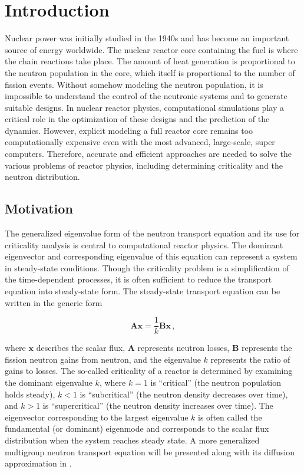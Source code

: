 \cleardoublepage

\chapter{Introduction}
\label{chapter:intro}
Nuclear power was initially studied in the 1940s and has become an important source of energy worldwide.
The nuclear reactor core containing the fuel is where the chain reactions take place.
The amount of heat generation is proportional to the neutron population in the core, which itself is proportional to the number of fission events. 
Without somehow modeling the neutron population, it is impossible to understand the control of the neutronic systems and to generate suitable designs. 
In nuclear reactor physics, computational simulations play a critical role in the optimization of these designs and the prediction of the dynamics.
However, explicit modeling a full reactor core remains too computationally expensive even with the most advanced, large-scale, super computers. 
Therefore, accurate and efficient approaches are needed to solve the various problems of reactor physics, including determining criticality and the neutron distribution.

\section{Motivation}

The generalized eigenvalue form of the neutron transport equation and its use for criticality analysis is central to computational reactor physics.
The dominant eigenvector and corresponding eigenvalue of this equation can represent a system in steady-state conditions.
Though the criticality problem is a simplification of the time-dependent processes, it is often sufficient to reduce the transport equation into steady-state form. 
The steady-state transport equation can be written in the generic form

\begin{equation}
 \mathbf{Ax} = \frac{1}{k} \mathbf{Bx}  \, ,
 \label{eq:Axb}
\end{equation}

where $\mathbf{x}$ describes the scalar flux, $\mathbf{A}$ represents neutron losses,  $\mathbf{B}$ represents the fission neutron gains from neutron, and the eigenvalue $k$ represents the ratio of gains to losses.
The so-called criticality of a reactor is determined by examining the dominant eigenvalue $k$, where $k=1$ is ``critical'' (the neutron population holds steady), $k<1$ is ``subcritical'' (the neutron density decreases over time), and $k > 1$ is ``supercritical'' (the neutron density increases over time).
The eigenvector corresponding to the largest eigenvalue $k$ is often called the fundamental (or dominant) eigenmode and corresponds to the scalar flux distribution when the system reaches steady state.
A more generalized multigroup neutron transport equation will be presented along with its diffusion approximation in .

